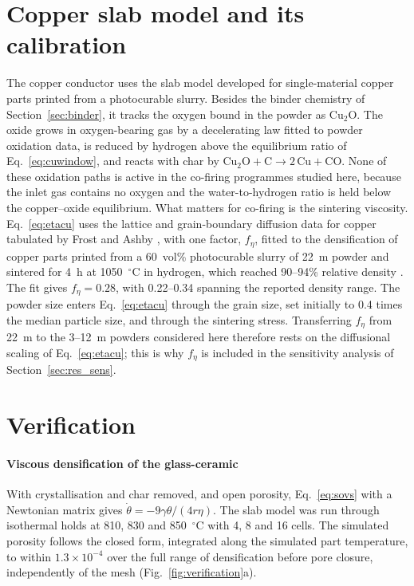 \appendix

\section{Copper slab model and its calibration}
\label{app:copper}

The copper conductor uses the slab model developed for single-material copper parts printed from a photocurable slurry. Besides the binder chemistry of Section~\ref{sec:binder}, it tracks the oxygen bound in the powder as Cu$_2$O. The oxide grows in oxygen-bearing gas by a decelerating law fitted to powder oxidation data, is reduced by hydrogen above the equilibrium ratio of Eq.~\eqref{eq:cuwindow}, and reacts with char by $\mathrm{Cu_2O} + \mathrm{C} \rightarrow 2\,\mathrm{Cu} + \mathrm{CO}$. None of these oxidation paths is active in the co-firing programmes studied here, because the inlet gas contains no oxygen and the water-to-hydrogen ratio is held below the copper--oxide equilibrium. What matters for co-firing is the sintering viscosity. Eq.~\eqref{eq:etacu} uses the lattice and grain-boundary diffusion data for copper tabulated by Frost and Ashby \cite{frost1982deformation}, with one factor, $f_\eta$, fitted to the densification of copper parts printed from a 60~vol\% photocurable slurry of 22~\textmu m powder and sintered for 4~h at 1050~$^\circ$C in hydrogen, which reached 90--94\% relative density \cite{roumanie2021influence}. The fit gives $f_\eta = 0.28$, with 0.22--0.34 spanning the reported density range. The powder size enters Eq.~\eqref{eq:etacu} through the grain size, set initially to 0.4 times the median particle size, and through the sintering stress. Transferring $f_\eta$ from 22~\textmu m to the 3--12~\textmu m powders considered here therefore rests on the diffusional scaling of Eq.~\eqref{eq:etacu}; this is why $f_\eta$ is included in the sensitivity analysis of Section~\ref{sec:res_sens}.

\section{Verification}
\label{app:verification}

\paragraph{Viscous densification of the glass-ceramic} With crystallisation and char removed, and open porosity, Eq.~\eqref{eq:sovs} with a Newtonian matrix gives $\dot{\theta} = -9\gamma\theta/(4r\eta)$. The slab model was run through isothermal holds at 810, 830 and 850~$^\circ$C with 4, 8 and 16 cells. The simulated porosity follows the closed form, integrated along the simulated part temperature, to within $1.3\times10^{-4}$ over the full range of densification before pore closure, independently of the mesh (Fig.~\ref{fig:verification}a).

